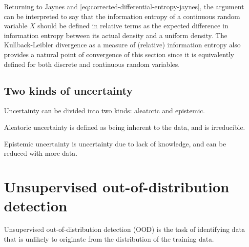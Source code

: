 Returning to Jaynes and \cref{eq:corrected-differential-entropy-jaynes}, the argument can be interpreted to say that the information entropy of a continuous random variable $X$ should be defined in relative terms as the expected difference in information entropy between its actual density and a uniform density.
The Kullback-Leibler divergence as a measure of (relative) information entropy also provides a natural point of convergence of this section since it is equivalently defined for both discrete and continuous random variables.



\subsection{Two kinds of uncertainty}


Uncertainty can be divided into two kinds: aleatoric and epistemic. 

Aleatoric uncertainty is defined as being inherent to the data, and is irreducible. 

Epistemic uncertainty is uncertainty due to lack of knowledge, and can be reduced with more data. 



\section{Unsupervised out-of-distribution detection}

Unsupervised out-of-distribution detection (OOD) is the task of identifying data that is unlikely to originate from the distribution of the training data.




